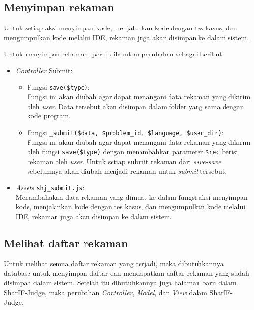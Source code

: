 \subsection{Menyimpan rekaman}
\label{sub:4:3:menyimpanrekaman}

Untuk setiap aksi menyimpan kode, menjalankan kode dengan tes kasus, dan mengumpulkan kode melalui IDE, rekaman juga akan disimpan ke dalam sistem.

Untuk menyimpan rekaman, perlu dilakukan perubahan sebagai berikut:

\begin{itemize}
    \item \textit{Controller} Submit:
        \begin{itemize}
            \item Fungsi \verb|save($type)|: \\
            Fungsi ini akan diubah agar dapat menangani data rekaman yang dikirim oleh \textit{user}. Data tersebut akan disimpan dalam folder yang sama dengan kode program.
            \item Fungsi \verb|_submit($data, $problem_id, $language, $user_dir)|: \\
            Fungsi ini akan diubah agar dapat menangani data rekaman yang dikirim oleh fungsi \verb|save($type)| dengan menambahkan parameter \verb|$rec| berisi rekaman oleh \textit{user}. Untuk setiap submit rekaman dari \textit{save-save} sebelumnya akan diubah menjadi rekaman untuk \textit{submit} tersebut.
        \end{itemize}
    \item \textit{Assets} \verb|shj_submit.js|: \\
        Menambahakan data rekaman yang dimuat ke dalam fungsi aksi menyimpan kode, menjalankan kode dengan tes kasus, dan mengumpulkan kode melalui IDE, rekaman juga akan disimpan ke dalam sistem.
\end{itemize}

\subsection{Melihat daftar rekaman}
\label{sub:4:3:melihatdaftarrekaman}

Untuk melihat semua daftar rekaman yang terjadi, maka dibutuhkannya database untuk menyimpan daftar dan mendapatkan daftar rekaman yang sudah disimpan dalam sistem. Setelah itu dibutuhkannya juga halaman baru dalam SharIF-Judge, maka perubahan \textit{Controller}, \textit{Model}, dan \textit{View} dalam SharIF-Judge.

